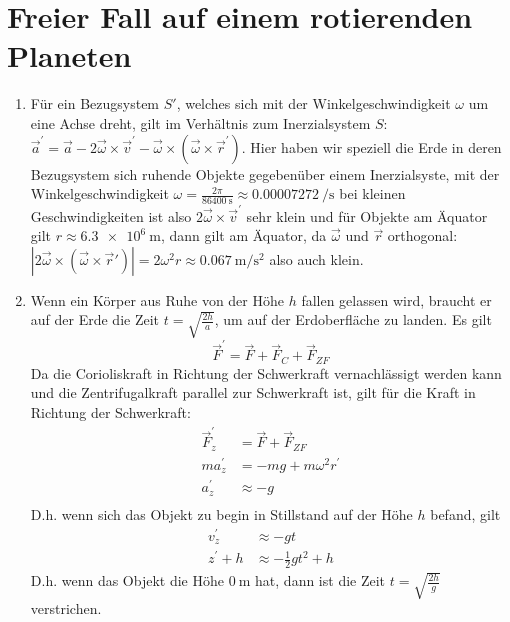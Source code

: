 \documentclass[sectionformat = aufgabe]{gadsescript}
\begin{document}
\maketitle

\section{Freier Fall auf einem rotierenden Planeten}
\begin{enumerate}[label=\alph*)]
	\item Für ein Bezugsystem $ S' $, welches sich mit der Winkelgeschwindigkeit $ \omega $ um eine Achse dreht, gilt im Verhältnis zum Inerzialsystem $ S $: $ \vec a^\prime = \vec a - 2 \vec \omega \times \vec v^\prime - \vec \omega \times ( \vec \omega \times \vec r^\prime ) $.
		Hier haben wir speziell die Erde in deren Bezugsystem sich ruhende Objekte gegebenüber einem Inerzialsyste,
		mit der Winkelgeschwindigkeit $ \omega = \frac{2\pi}{\qty{86400}{\second}} \approx \qty{0.00007272}{\per\second} $ bei kleinen Geschwindigkeiten ist also $ 2 \vec \omega \times \vec v ^\prime $ sehr klein und für Objekte am Äquator gilt $ r \approx \qty{6.3e6}{\metre} $,
		dann gilt am Äquator,
		da $ \vec \omega $ und $ \vec r $ orthogonal: $ | 2 \vec \omega \times ( \vec \omega \times \vec r' ) | = 2 \omega^2 r \approx \qty{0.067}{\metre\per\square\second} $ also auch klein.
	\item Wenn ein Körper aus Ruhe von der Höhe $ h $ fallen gelassen wird, braucht er auf der Erde die Zeit $ t = \sqrt{\frac{2h}{a}} $, um auf der Erdoberfläche zu landen.
		Es gilt
		\[ \vec F^\prime = \vec F + \vec F_{C} + \vec F_{ZF} \]
		Da die Corioliskraft in Richtung der Schwerkraft vernachlässigt werden kann und die Zentrifugalkraft parallel zur Schwerkraft ist, gilt für die Kraft in Richtung der Schwerkraft:
		\begin{align*}
			\vec F_z^\prime &= \vec F + \vec F_{ZF}\\
			ma_z^\prime &= -mg + m\omega^2 r^\prime\\
			a_z^\prime &\approx -g\\
		\end{align*}
		D.h. wenn sich das Objekt zu begin in Stillstand auf der Höhe $ h $ befand, gilt
		\begin{align*}
			v_z^\prime &\approx -gt\\
			z^\prime + h &\approx -\frac{1}{2} gt^2 + h
		\end{align*}
		D.h. wenn das Objekt die Höhe $ \qty{0}{\metre} $ hat, dann ist die Zeit $ t = \sqrt{\frac{2h}{g}} $ verstrichen.\\

\end{enumerate}
\end{document}
